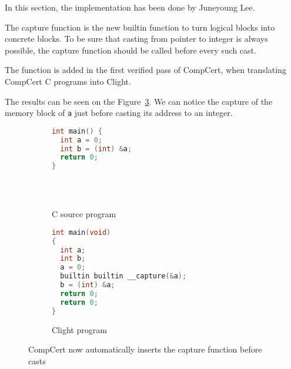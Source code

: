 \label{sec:capturesem}

In this section, the implementation has been done by Juneyoung Lee.

The capture function is the new builtin function to turn logical blocks into concrete blocks.
To be sure that casting from pointer to integer is always possible, the capture function should be called before every such cast.

The function is added in the first verified pass of CompCert, when translating CompCert C programs into Clight.

The results can be seen on the Figure~\ref{fig:captureexample}. We can notice the capture of the memory block of \texttt{a} just before casting its address to an integer.

\begin{figure}[H]
\begin{subfigure}{.48\textwidth}
  \begin{lstlisting}[language=C]
int main() {
  int a = 0;
  int b = (int) &a;
  return 0;
}





  \end{lstlisting}
  \caption{C source program}
  \label{fig:capturec}
\end{subfigure}
\begin{subfigure}{.48\textwidth}
  \begin{lstlisting}[language=C]
int main(void)
{
  int a;
  int b;
  a = 0;
  builtin builtin __capture(&a);
  b = (int) &a;
  return 0;
  return 0;
}
  \end{lstlisting}
  \caption{Clight program}
  \label{fig:captureclight}
\end{subfigure}
\caption{CompCert now automatically inserts the capture function before casts}
\label{fig:captureexample}
\end{figure}

